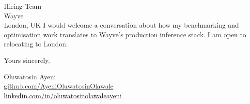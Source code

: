 \documentclass[12pt,a4paper]{letter}
\begin{document}
\begin{letter}{Hiring Team \\ Wayve \\ London, UK}
I would welcome a conversation about how my benchmarking and optimisation work translates to Wayve's production inference stack. I am open to relocating to London.

\closing{Yours sincerely,}

Oluwatosin Ayeni \\
\href{https://github.com/AyeniOluwatosinOlawale}{github.com/AyeniOluwatosinOlawale} \\
\href{https://www.linkedin.com/in/oluwatosinolawaleayeni/}{linkedin.com/in/oluwatosinolawaleayeni}

\end{letter}
\end{document}
